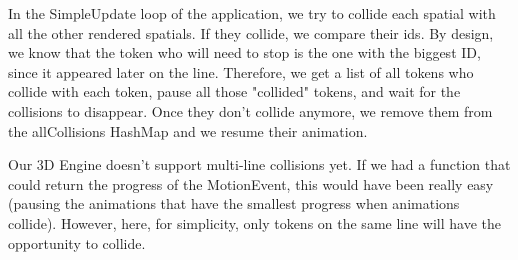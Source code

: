 In the SimpleUpdate loop of the application, we try to collide each spatial with all the other rendered spatials. If they collide, we compare their ids. By design, we know that the token who will need to stop is the one with the biggest ID, since it appeared later on the line. Therefore, we get a list of all tokens who collide with each token, pause all those "collided" tokens, and wait for the collisions to disappear. Once they don't collide anymore, we remove them from the allCollisions HashMap and we resume their animation.

Our 3D Engine doesn't support multi-line collisions yet. If we had a function that could return the progress of the MotionEvent, this would have been really easy (pausing the animations that have the smallest progress when animations collide). However, here, for simplicity, only tokens on the same line will have the opportunity to collide.
